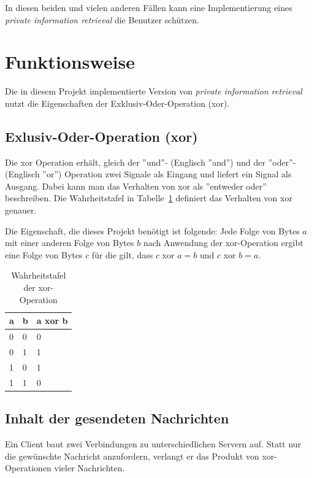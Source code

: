 \documentclass[]{article}
\begin{document}
In diesen beiden und vielen anderen Fällen kann eine Implementierung eines \textit{private information retrieval} die Benutzer schützen.

\section{Funktionsweise}
Die in diesem Projekt implementierte Version von \textit{private information retrieval} nutzt die Eigenschaften der Exklusiv-Oder-Operation (xor).

\subsection{Exlusiv-Oder-Operation (xor)}
Die xor Operation erhält, gleich der ''und''- (Englisch ''and'') und der ''oder''- (Englisch ''or'') Operation zwei Signale als Eingang und liefert ein Signal als Ausgang. Dabei kann man das Verhalten von xor als ''entweder oder'' beschreiben. Die Wahrheitstafel in Tabelle~\ref{tab:wahrheitstafel_xor} definiert das Verhalten von xor genauer.

Die Eigenschaft, die dieses Projekt benötigt ist folgende: Jede Folge von Bytes $a$ mit einer anderen Folge von Bytes $b$ nach Anwendung der xor-Operation ergibt eine Folge von Bytes $c$ für die gilt, dass $c$ xor $a = b$ und $c$ xor $b = a$.

\begin{table}[]
	\centering
	\begin{tabular}{|l|l|l|}
		\hline
		\textbf{a} & \textbf{b} & \textbf{a xor b} \\ \hline
		0          & 0          & 0                \\ \hline
		0          & 1          & 1                \\ \hline
		1          & 0          & 1                \\ \hline
		1          & 1          & 0                \\ \hline
	\end{tabular}
	\caption{Wahrheitstafel der xor-Operation}
	\label{tab:wahrheitstafel_xor}
\end{table}

\subsection{Inhalt der gesendeten Nachrichten}
Ein Client baut zwei Verbindungen zu unterschiedlichen Servern auf. Statt nur die gewünschte Nachricht anzufordern, verlangt er das Produkt von xor-Operationen vieler Nachrichten.
\end{document}
